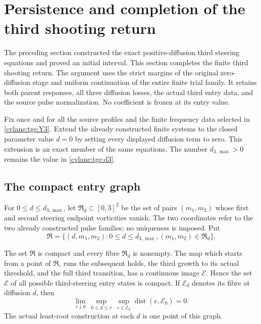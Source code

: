 \section{Persistence and completion of the third shooting return}
\label{cvlane:trc:section}

The preceding section constructed the exact positive-diffusion third
steering equations and proved an initial interval.  This section completes
the finite third shooting return.  The argument uses the strict margins of
the original zero-diffusion stage and uniform continuation of the entire
finite trial family.  It retains both parent responses, all three diffusion
losses, the actual third entry data, and the source pulse normalization.
No coefficient is frozen at its entry value.

Fix once and for all the source profiles and the finite frequency data
selected in \eqref{cvlane:tge:Y3}.  Extend the already constructed finite systems
to the closed parameter value $d=0$ by setting every displayed diffusion
term to zero.  This extension is an exact member of the same equations.
The number $d_{3,\max}>0$ remains the value in \eqref{cvlane:tge:d3}.

\subsection{The compact entry graph}

For $0\leq d\leq d_{3,\max}$, let $\mathfrak R_d\subset[0,3]^2$
be the set of pairs $(m_1,m_2)$ whose first and second steering endpoint
vorticities vanish.  The two coordinates refer to the two already
constructed pulse families; no uniqueness is imposed.  Put
\[
 \mathfrak R=\{(d,m_1,m_2):0\leq d\leq d_{3,\max},
                    (m_1,m_2)\in\mathfrak R_d\}.
\]

\begin{cvlanlemma}\label{cvlane:trc:entry-compact}
The set $\mathfrak R$ is compact and every fibre $\mathfrak R_d$ is
nonempty.  The map which starts from a point of $\mathfrak R$, runs the
subsequent holds, the third growth to its actual threshold, and the full
third transition, has a continuous image $\mathcal E$.  Hence the set
$\mathcal E$ of all possible third-steering entry states is compact.  If
$\mathcal E_d$ denotes its fibre at diffusion $d$, then
\begin{equation}\label{cvlane:trc:entry-semicontinuity}
 \lim_{r\downarrow0}\ 
 \sup_{0\leq d\leq r}\ \sup_{e\in\mathcal E_d}
          \operatorname{dist}(e,\mathcal E_0)=0.
\end{equation}
The actual least-root construction at each $d$ is one point of this graph.
\end{cvlanlemma}

